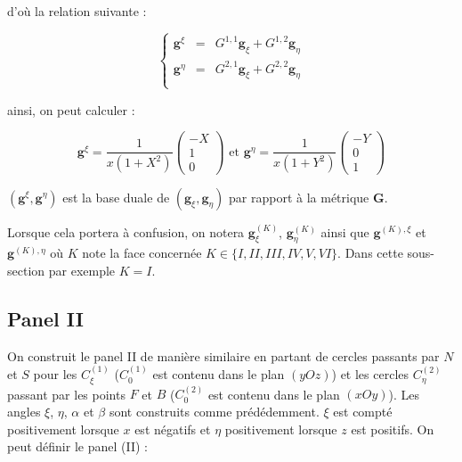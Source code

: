 d'où la relation suivante :

\begin{equation}
\left\lbrace
\begin{array}{rcl}
\mathbf{g}^{\xi} & = & G^{1,1} \mathbf{g}_{\xi} + G^{1,2} \mathbf{g}_{\eta} \\
\mathbf{g}^{\eta} & = & G^{2,1} \mathbf{g}_{\xi} + G^{2,2} \mathbf{g}_{\eta} \\
\end{array}
\right.
\end{equation}

ainsi, on peut calculer :

\begin{equation}
\mathbf{g}^{\xi} = \dfrac{1}{x(1+X^2)}\begin{pmatrix}
-X \\ 1 \\ 0
\end{pmatrix} \text{ et } \mathbf{g}^{\eta} = \dfrac{1}{x(1+Y^2)}\begin{pmatrix}
-Y \\ 0 \\ 1
\end{pmatrix}
\label{eq: base duale I}
\end{equation}

$( \mathbf{g}^{\xi}, \mathbf{g}^{\eta})$ est la base duale de $(\mathbf{g}_{\xi}, \mathbf{g}_{\eta})$ par rapport à la métrique $\mathbf{G}$.

\begin{remarque}
Lorsque cela portera à confusion, on notera $\mathbf{g}_{\xi}^{(K)}$, $\mathbf{g}_{\eta}^{(K)}$ ainsi que $\mathbf{g}^{(K),\xi}$ et $\mathbf{g}^{(K),\eta}$ où $K$ note la face concernée $K \in \lbrace I, II, III, IV, V, VI \rbrace$. Dans cette sous-section par exemple $K=I$.   
\end{remarque}






\subsection{Panel II}

On construit le panel II de manière similaire en partant de cercles passants par $N$ et $S$ pour les $C_{\xi}^{(1)}$ ($C_{0}^{(1)}$ est contenu dans le plan $(yOz)$) et les cercles $C_{\eta}^{(2)}$ passant par les points $F$ et $B$ ($C_{0}^{(2)}$ est contenu dans le plan $(xOy)$). Les angles $\xi$, $\eta$, $\alpha$ et $\beta$ sont construits comme prédédemment.  $\xi$ est compté positivement lorsque $x$ est négatifs et $\eta$ positivement lorsque $z$ est positifs.
On peut définir le panel (II) :

